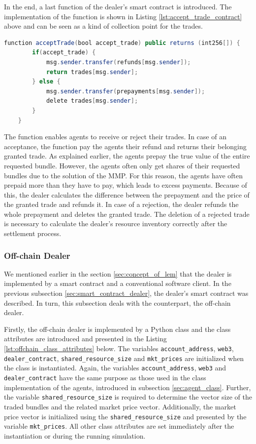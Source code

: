 In the end, a last function of the dealer's smart contract is introduced.
The implementation of the function is shown in Listing \ref{lst:accept_trade_contract} above
and can be seen as a kind of collection point for the trades.

\begin{lstlisting}[float=htbp, label=lst:accept_trade_contract, caption=Collection point of trades, language=Java]
    function acceptTrade(bool accept_trade) public returns (int256[]) {
        if(accept_trade) {
            msg.sender.transfer(refunds[msg.sender]);
            return trades[msg.sender];
        } else {
            msg.sender.transfer(prepayments[msg.sender]);
            delete trades[msg.sender];
        }
    }
\end{lstlisting}

The function enables agents to receive or reject their trades. 
In case of an acceptance, the function pay the agents their refund
and returns their belonging granted trade.
As explained earlier, the agents prepay the true value of the entire requested bundle.
However, the agents often only get shares of their requested bundles due to the solution of the 
MMP.
For this reason, the agents have often prepaid more than they have to pay, which leads to 
excess payments. Because of this, the dealer calculates the difference between the prepayment 
and the price of the granted trade and refunds it.
In case of a rejection, the dealer refunds the whole prepayment and deletes the granted trade.
The deletion of a rejected trade is necessary to calculate the dealer's resource inventory correctly
after the settlement process.


\subsubsection{Off-chain Dealer}
\label{sec:off_chain_component}
We mentioned earlier in the section \ref{sec:concept_of_lem} that the 
dealer is implemented by a smart contract and a conventional software client.
In the previous subsection \ref{sec:smart_contract_dealer}, the 
dealer's smart contract was described. In turn, 
this subsection deals with the counterpart, the off-chain dealer. 

Firstly, the off-chain dealer is implemented by a Python class and the 
class attributes are introduced and presented in the Listing \ref{lst:offchain_class_attributes} below.
The variables \verb|account_address|, \verb|web3|, 
\verb|dealer_contract|, \verb|shared_resource_size| and \verb|mkt_prices| 
are initialized when the class is instantiated.
Again, the variables \verb|account_address|, \verb|web3| and 
\verb|dealer_contract| have the same purpose as those used in the class implementation of 
the agents, introduced in subsection \ref{sec:agent_class}.
Further, the variable \verb|shared_resource_size| is required to determine the vector size 
of the traded bundles and the related market price vector. 
Additionally, the market price vector is initialized using the \verb|shared_resource_size|
and presented by the variable \verb|mkt_prices|.
All other class attributes are set immediately after 
the instantiation or during the running simulation.

